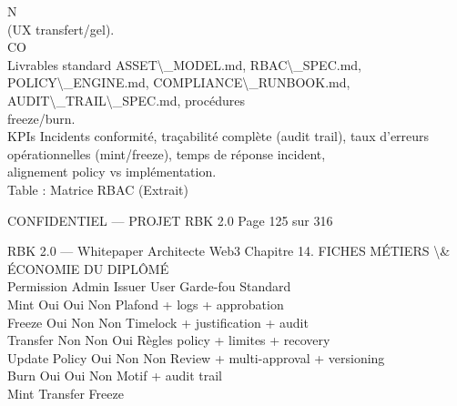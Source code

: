 \vspace{0.5em}
\vspace{0.5em}
N\\
(UX transfert/gel).\\
CO\\
Livrables standard    ASSET\textbackslash{}_MODEL.md, RBAC\textbackslash{}_SPEC.md, POLICY\textbackslash{}_ENGINE.md, COMPLIANCE\textbackslash{}_RUNBOOK.md, AUDIT\textbackslash{}_TRAIL\textbackslash{}_SPEC.md, procédures\\
freeze/burn.\\
\vspace{0.5em}
KPIs Incidents conformité, traçabilité complète (audit trail), taux d’erreurs opérationnelles (mint/freeze), temps de réponse incident,\\
alignement policy vs implémentation.\\
\vspace{0.5em}
Table : Matrice RBAC (Extrait)\\
\vspace{0.5em}
\vspace{0.5em}
\vspace{0.5em}
\vspace{0.5em}
\begin{confidential}CONFIDENTIEL — PROJET RBK 2.0                                 Page 125 sur 316\end{confidential}
RBK 2.0 — Whitepaper Architecte Web3                                                  Chapitre 14. FICHES MÉTIERS \textbackslash{}& ÉCONOMIE DU DIPLÔMÉ\\
\vspace{0.5em}
\vspace{0.5em}
Permission   Admin Issuer User Garde-fou Standard\\
Mint          Oui    Oui Non Plafond + logs + approbation\\
Freeze        Oui   Non Non Timelock + justification + audit\\
Transfer      Non   Non Oui Règles policy + limites + recovery\\
Update Policy Oui   Non Non Review + multi-approval + versioning\\
Burn          Oui    Oui Non Motif + audit trail\\
\vspace{0.5em}
\vspace{0.5em}
\vspace{0.5em}
Mint           Transfer          Freeze\\
\vspace{0.5em}
